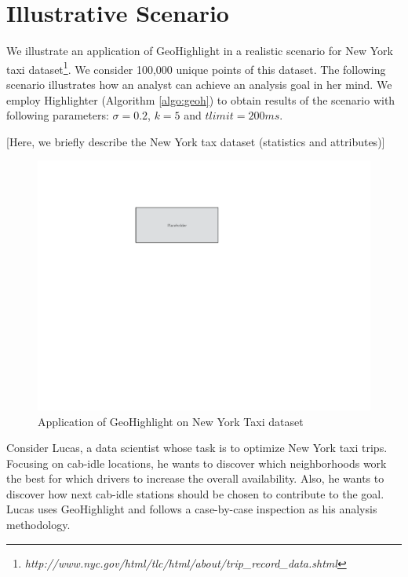 \section{Illustrative Scenario}\label{sec:scenarios}
We illustrate an application of {\sc GeoHighlight} in a realistic scenario for New York taxi dataset\footnote{\it http://www.nyc.gov/html/tlc/html/about/trip_record_data.shtml}. We consider 100,000 unique points of this dataset. The following scenario illustrates how an analyst can achieve an analysis goal in her mind. We employ {\sc Highlighter} (Algorithm \ref{algo:geoh}) to obtain results of the scenario with following parameters: $\sigma = 0.2$, $k = 5$ and $tlimit = 200ms$. 

\vspace{5pt}
 [Here, we briefly describe the New York tax dataset (statistics and attributes)]

\begin{figure}
  \centering
  \includegraphics[width=\columnwidth]{figs/placeholder}
\caption{Application of {\sc GeoHighlight} on New York Taxi dataset}
\label{fig:app}
\end{figure}

\vspace{5pt}
Consider Lucas, a data scientist whose task is to optimize New York taxi trips. Focusing on cab-idle locations, he wants to discover which neighborhoods work the best for which drivers to increase the overall availability. Also, he wants to discover how next cab-idle stations should be chosen to contribute to the goal. Lucas uses {\sc GeoHighlight} and follows a case-by-case inspection as his analysis methodology.

